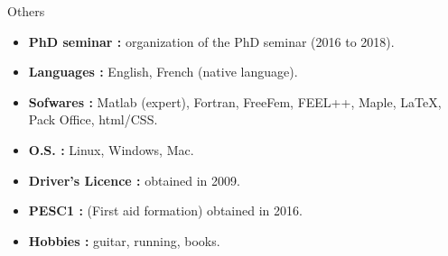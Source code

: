 \documentclass[10pt,a4paper]{report}
\begin{document}
\vspace{0.6cm}
\noindent
{\selectfont
\begin{Large}
Others
\end{Large}
\hrulefill
}

\vspace{1cm}
\noindent
\begin{itemize}
\item \textbf{PhD seminar :} organization of the PhD seminar (2016 to 2018).
\item \textbf{Languages :} English, French (native language).
\item \textbf{Sofwares :} Matlab (expert), Fortran, FreeFem, FEEL++, Maple, \LaTeX, Pack Office, html/CSS.
\item \textbf{O.S. :} Linux, Windows, Mac.
\item \textbf{Driver's Licence :} obtained in 2009.
\item \textbf{PESC1 :} (First aid formation) obtained in 2016.
\item \textbf{Hobbies :} guitar, running, books.

\end{itemize}
\end{document}
